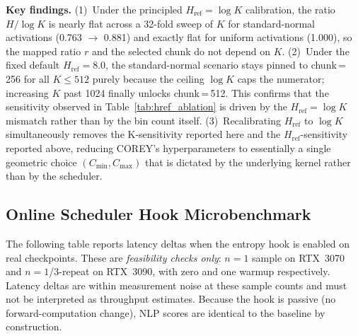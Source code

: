 \noindent\textbf{Key findings.}
(1)~Under the principled $H_{\text{ref}}{=}\log K$ calibration, the ratio $H/\log K$ is nearly flat across a 32-fold sweep of $K$ for standard-normal activations (0.763 $\to$ 0.881) and exactly flat for uniform activations (1.000), so the mapped ratio $r$ and the selected chunk do not depend on $K$.
(2)~Under the fixed default $H_{\text{ref}}{=}8.0$, the standard-normal scenario stays pinned to chunk\,=\,256 for all $K \le 512$ purely because the ceiling $\log K$ caps the numerator; increasing $K$ past 1024 finally unlocks chunk\,=\,512. This confirms that the sensitivity observed in Table~\ref{tab:href_ablation} is driven by the $H_{\text{ref}}{=}\log K$ mismatch rather than by the bin count itself.
(3)~Recalibrating $H_{\text{ref}}$ to $\log K$ simultaneously removes the K-sensitivity reported here and the $H_{\text{ref}}$-sensitivity reported above, reducing COREY's hyperparameters to essentially a single geometric choice $(C_{\min}, C_{\max})$ that is dictated by the underlying kernel rather than by the scheduler.

\subsection{Online Scheduler Hook Microbenchmark}
\label{sec:hook_micro}

The following table reports latency deltas when the entropy hook is enabled on real checkpoints.
These are \emph{feasibility checks only}: $n{=}1$ sample on RTX~3070 and $n{=}1$/$3$-repeat on RTX~3090, with zero and one warmup respectively.
Latency deltas are within measurement noise at these sample counts and must not be interpreted as throughput estimates.
Because the hook is passive (no forward-computation change), NLP scores are identical to the baseline by construction.

